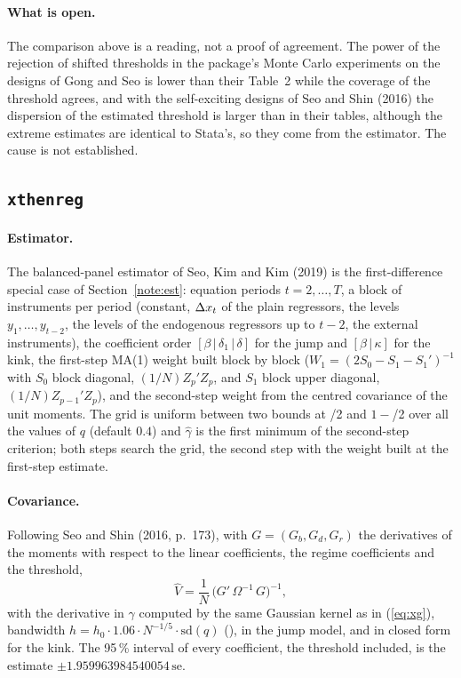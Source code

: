 \documentclass[
  10.5pt,
  a4paper,
]{article}
\begin{document}
\paragraph{What is open.} The comparison above is a reading, not a proof of agreement. The power of the
rejection of shifted thresholds in the package's Monte Carlo experiments on the designs of Gong and Seo is lower than
their Table~2 while the coverage of the threshold agrees, and with the self-exciting designs of Seo and Shin
(2016) the dispersion of the estimated threshold is larger than in their tables, although the extreme estimates are
identical to Stata's, so they come from the estimator. The cause is not established.

\subsection{\texttt{xthenreg}}\label{note:xthenreg}

\paragraph{Estimator.} The balanced-panel estimator of Seo, Kim and Kim (2019) is the first-difference special
case of Section~\ref{note:est}: equation periods $t=2,\dots,T$, a block of instruments per period
(constant, $\Delta x_t$ of the plain regressors, the levels $y_1,\dots,y_{t-2}$, the levels of the endogenous
regressors up to $t-2$, the external instruments), the coefficient order $[\beta\,|\,\delta_1\,|\,\delta]$ for the
jump and $[\beta\,|\,\kappa]$ for the kink, the first-step MA(1) weight built block by block
($W_1=(2S_0-S_1-S_1')^{-1}$ with $S_0$ block diagonal, $(1/N)Z_p'Z_p$, and $S_1$ block upper diagonal, $(1/N)Z_{p-1}'Z_p$), and the
second-step weight from the centred covariance of the unit moments. The grid is uniform between two
 bounds at /2 and $1-$/2 over all the values of $q$ (default
 $0.4$) and $\hat\gamma$ is the first minimum of the second-step criterion; both steps
search the grid, the second step with the weight built at the first-step estimate.

\paragraph{Covariance.} Following Seo and Shin (2016, p.~173), with $G=(G_b,G_d,G_r)$ the derivatives of the
moments with respect to the linear coefficients, the regime coefficients and the threshold,
\begin{equation}\label{eq:xhcov}
\widehat V=\frac1N\,\bigl(G'\,\Omega^{-1}\,G\bigr)^{-1},
\end{equation}
with the derivative in $\gamma$ computed by the same Gaussian kernel as in (\ref{eq:xg}), bandwidth
$h=h_0\cdot1.06\cdot N^{-1/5}\cdot\mathrm{sd}(q)$ (), in the jump model, and in closed form for the kink.
The 95\,\% interval of every coefficient, the threshold included, is the estimate $\pm1.959963984540054\,\mathrm{se}$.
\end{document}
